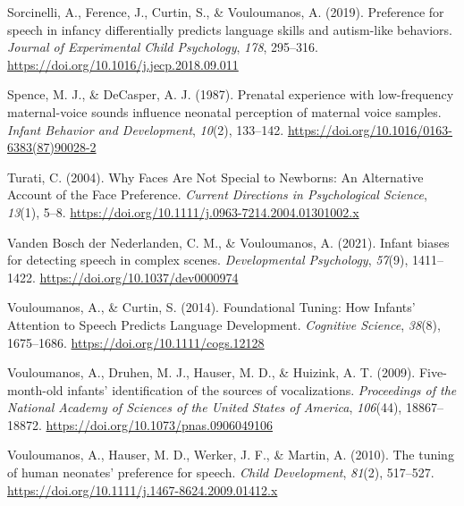 \documentclass[
  man,mask,floatsintext]{apa6}
\newlength{\cslhangindent}
\newlength{\cslentryspacingunit} %
\newenvironment{CSLReferences}[2] %
 {%
  \setlength{\parindent}{0pt}
  \ifodd #1
  \let\oldpar\par
  \def\par{\hangindent=\cslhangindent\oldpar}
  \fi
  \setlength{\parskip}{#2\cslentryspacingunit}
 }%
 {}
\begin{document}
\begin{CSLReferences}{1}{0}
\leavevmode{}%
Sorcinelli, A., Ference, J., Curtin, S., \& Vouloumanos, A. (2019). Preference for speech in infancy differentially predicts language skills and autism-like behaviors. \emph{Journal of Experimental Child Psychology}, \emph{178}, 295--316. \url{https://doi.org/10.1016/j.jecp.2018.09.011}

\leavevmode{}%
Spence, M. J., \& DeCasper, A. J. (1987). Prenatal experience with low-frequency maternal-voice sounds influence neonatal perception of maternal voice samples. \emph{Infant Behavior and Development}, \emph{10}(2), 133--142. \url{https://doi.org/10.1016/0163-6383(87)90028-2}

\leavevmode{}%
Turati, C. (2004). Why {Faces} {Are} {Not} {Special} to {Newborns}: {An} {Alternative} {Account} of the {Face} {Preference}. \emph{Current Directions in Psychological Science}, \emph{13}(1), 5--8. \url{https://doi.org/10.1111/j.0963-7214.2004.01301002.x}

\leavevmode{}%
Vanden Bosch der Nederlanden, C. M., \& Vouloumanos, A. (2021). Infant biases for detecting speech in complex scenes. \emph{Developmental Psychology}, \emph{57}(9), 1411--1422. \url{https://doi.org/10.1037/dev0000974}

\leavevmode{}%
Vouloumanos, A., \& Curtin, S. (2014). Foundational {Tuning}: {How} {Infants}' {Attention} to {Speech} {Predicts} {Language} {Development}. \emph{Cognitive Science}, \emph{38}(8), 1675--1686. \url{https://doi.org/10.1111/cogs.12128}

\leavevmode{}%
Vouloumanos, A., Druhen, M. J., Hauser, M. D., \& Huizink, A. T. (2009). Five-month-old infants' identification of the sources of vocalizations. \emph{Proceedings of the National Academy of Sciences of the United States of America}, \emph{106}(44), 18867--18872. \url{https://doi.org/10.1073/pnas.0906049106}

\leavevmode{}%
Vouloumanos, A., Hauser, M. D., Werker, J. F., \& Martin, A. (2010). The tuning of human neonates' preference for speech. \emph{Child Development}, \emph{81}(2), 517--527. \url{https://doi.org/10.1111/j.1467-8624.2009.01412.x}


\end{CSLReferences}
\end{document}
